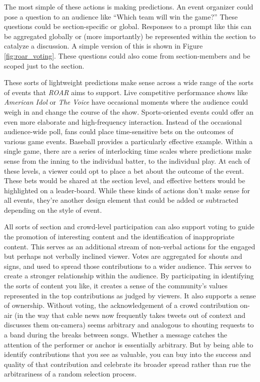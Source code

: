 The most simple of these actions is making predictions. An event organizer could pose a question to an audience like ``Which team will win the game?'' These questions could be section-specific or global. Responses to a prompt like this can be aggregated globally or (more importantly) be represented within the section to catalyze a discussion. A simple version of this is shown in Figure \ref{fig:roar_voting}. These questions could also come from section-members and be scoped just to the section.

These sorts of lightweight predictions make sense across a wide range of the sorts of events that \emph{ROAR} aims to support. Live competitive performance shows like \emph{American Idol} or \emph{The Voice} have occasional moments where the audience could weigh in and change the course of the show. Sports-oriented events could offer an even more elaborate and high-frequency interaction. Instead of the occasional audience-wide poll, fans could place time-sensitive bets on the outcomes of various game events. Baseball provides a particularly effective example. Within a single game, there are a series of interlocking time scales where predictions make sense from the inning to the individual batter, to the individual play. At each of these levels, a viewer could opt to place a bet about the outcome of the event. These bets would be shared at the section level, and effective betters would be highlighted on a leader-board. While these kinds of actions don't make sense for all events, they're another design element that could be added or subtracted depending on the style of event. 

All sorts of section and crowd-level participation can also support voting to guide the promotion of interesting content and the identification of inappropriate content. This serves as an additional stream of non-verbal actions for the engaged but perhaps not verbally inclined viewer. Votes are aggregated for shouts and signs, and used to spread those contributions to a wider audience. This serves to create a stronger relationship within the audience. By participating in identifying the sorts of content you like, it creates a sense of the community's values represented in the top contributions as judged by viewers. It also supports a sense of ownership. Without voting, the acknowledgement of a crowd contribution on-air (in the way that cable news now frequently takes tweets out of context and discusses them on-camera) seems arbitrary and analogous to shouting requests to a band during the breaks between songs. Whether a message catches the attention of the performer or anchor is essentially arbitrary. But by being able to identify contributions that you see as valuable, you can buy into the success and quality of that contribution and celebrate its broader spread rather than rue the arbitrariness of a random selection process.

